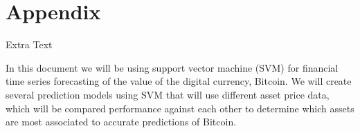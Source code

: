 \appendix

\section{Appendix}

Extra Text

In this document we will be using support vector machine (SVM) for financial time series forecasting of the value of the digital currency, Bitcoin. We will create several prediction models using SVM that will use different asset price data, which will be compared performance against each other to determine which assets are most associated to accurate predictions of Bitcoin.  


